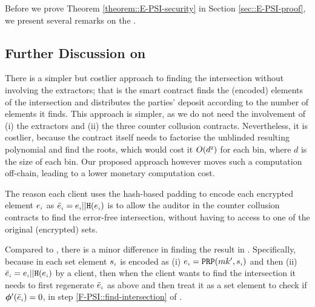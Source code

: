 Before we prove Theorem \ref{theorem::E-PSI-security} in Section \ref{sec::E-PSI-proof}, we  present several remarks on the \epsi. 
%

\subsection{Further Discussion on \withRew}\label{sec::Discussion-Anesidora}
There is a simpler but costlier approach to finding the intersection without involving the extractors; that is the smart contract finds the (encoded) elements of the intersection and distributes the parties' deposit according to the number of elements it finds. This approach is simpler, as we do not need the involvement of (i) the extractors and (ii) the three counter collusion contracts. Nevertheless, it is costlier, because the contract itself needs to factorise the unblinded resulting polynomial and find the roots, which would cost it $O(d^{\scriptscriptstyle 2})$ for each bin, where $d$ is the size of each bin. Our proposed approach however moves such a computation off-chain, leading to a lower monetary computation cost. 



The reason each client uses the hash-based padding to encode each encrypted element $e_{\scriptscriptstyle i}$  as $\bar{e}_{\scriptscriptstyle i} =e_{\scriptscriptstyle i} || \mathtt{H}(e_{\scriptscriptstyle i})$ is to allow the auditor in the counter collusion contracts to find the error-free intersection, without having to access to one of the original (encrypted) sets. 

Compared to \fpsi, there is a minor difference in finding the result in \epsi. Specifically, because in \epsi each set element  $s_{\scriptscriptstyle i}$ is encoded as  (i) $e_{\scriptscriptstyle i}=\mathtt{PRP}(mk', s_{\scriptscriptstyle i})$ and then (ii) $\bar{e}_{\scriptscriptstyle i} =e_{\scriptscriptstyle i} || \mathtt{H}(e_{\scriptscriptstyle i})$ by a client, then when the client wants to find the intersection it needs to first regenerate $\bar{e}_{\scriptscriptstyle i}$ as above and then treat it as a set element to check if  $\bm\phi'(\bar e_{\scriptscriptstyle i})=0$, in step \ref{F-PSI::find-intersection} of \fpsi.

%



